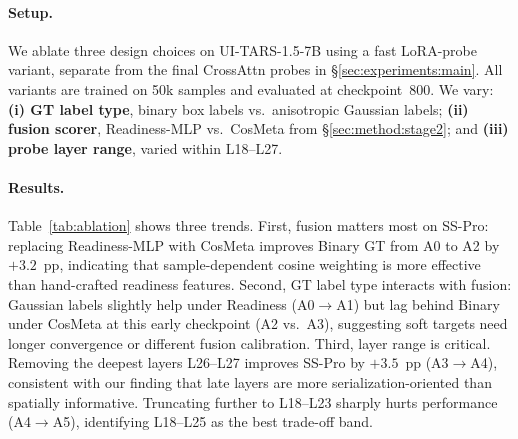 \paragraph{Setup.}
We ablate three design choices on UI-TARS-1.5-7B using a fast LoRA-probe variant, separate from the final CrossAttn probes in \S\ref{sec:experiments:main}.
All variants are trained on 50k samples and evaluated at checkpoint~800.
We vary:
\textbf{(i) GT label type}, binary box labels vs.\ anisotropic Gaussian labels;
\textbf{(ii) fusion scorer}, Readiness-MLP vs.\ CosMeta from \S\ref{sec:method:stage2};
and \textbf{(iii) probe layer range}, varied within L18--L27.

\paragraph{Results.}
Table~\ref{tab:ablation} shows three trends.
First, fusion matters most on SS-Pro: replacing Readiness-MLP with CosMeta improves Binary GT from A0 to A2 by $+3.2$~pp, indicating that sample-dependent cosine weighting is more effective than hand-crafted readiness features.
Second, GT label type interacts with fusion: Gaussian labels slightly help under Readiness (A0$\to$A1) but lag behind Binary under CosMeta at this early checkpoint (A2 vs.\ A3), suggesting soft targets need longer convergence or different fusion calibration.
Third, layer range is critical.
Removing the deepest layers L26--L27 improves SS-Pro by $+3.5$~pp (A3$\to$A4), consistent with our finding that late layers are more serialization-oriented than spatially informative.
Truncating further to L18--L23 sharply hurts performance (A4$\to$A5), identifying L18--L25 as the best trade-off band.


